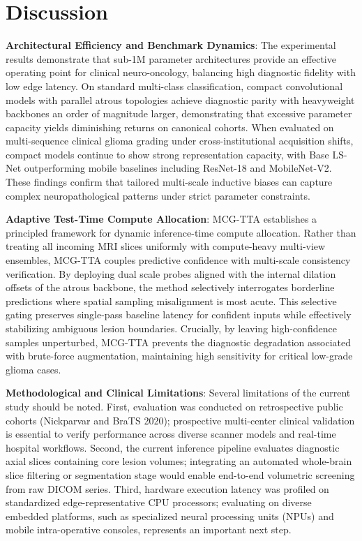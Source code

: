\section{Discussion}

\noindent\textbf{Architectural Efficiency and Benchmark Dynamics}: The experimental results demonstrate that sub-1M parameter architectures provide an effective operating point for clinical neuro-oncology, balancing high diagnostic fidelity with low edge latency. On standard multi-class classification, compact convolutional models with parallel atrous topologies achieve diagnostic parity with heavyweight backbones an order of magnitude larger, demonstrating that excessive parameter capacity yields diminishing returns on canonical cohorts. When evaluated on multi-sequence clinical glioma grading under cross-institutional acquisition shifts, compact models continue to show strong representation capacity, with Base LS-Net outperforming mobile baselines including ResNet-18 and MobileNet-V2. These findings confirm that tailored multi-scale inductive biases can capture complex neuropathological patterns under strict parameter constraints.

\noindent\textbf{Adaptive Test-Time Compute Allocation}: MCG-TTA establishes a principled framework for dynamic inference-time compute allocation. Rather than treating all incoming MRI slices uniformly with compute-heavy multi-view ensembles, MCG-TTA couples predictive confidence with multi-scale consistency verification. By deploying dual scale probes aligned with the internal dilation offsets of the atrous backbone, the method selectively interrogates borderline predictions where spatial sampling misalignment is most acute. This selective gating preserves single-pass baseline latency for confident inputs while effectively stabilizing ambiguous lesion boundaries. Crucially, by leaving high-confidence samples unperturbed, MCG-TTA prevents the diagnostic degradation associated with brute-force augmentation, maintaining high sensitivity for critical low-grade glioma cases.

\noindent\textbf{Methodological and Clinical Limitations}: Several limitations of the current study should be noted. First, evaluation was conducted on retrospective public cohorts (Nickparvar and BraTS 2020); prospective multi-center clinical validation is essential to verify performance across diverse scanner models and real-time hospital workflows. Second, the current inference pipeline evaluates diagnostic axial slices containing core lesion volumes; integrating an automated whole-brain slice filtering or segmentation stage would enable end-to-end volumetric screening from raw DICOM series. Third, hardware execution latency was profiled on standardized edge-representative CPU processors; evaluating on diverse embedded platforms, such as specialized neural processing units (NPUs) and mobile intra-operative consoles, represents an important next step.

